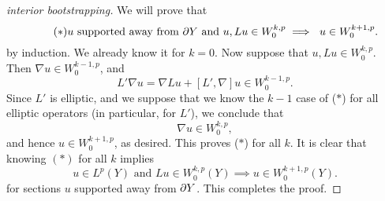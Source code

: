 \documentclass{amsart}
\begin{document}
   \begin{proof}[interior bootstrapping]
     We will prove that
     \begin{equation*}\tag{$\ast$}
       u\text{ supported away from $\partial Y$ and $u,Lu\in
         W^{k,p}_{0}$}\implies\text{ $u\in W^{k+1,p}_{0}$}.
     \end{equation*}
     by induction. We already know it for $k=0$. Now suppose that
     $u,Lu\in W^{k,p}_{0}$. Then $\nabla u\in W^{k-1,p}_{0}$, and
     \begin{equation*}
       L'\nabla u=\nabla L u+[L',\nabla]u\in W^{k-1,p}_{0}.
     \end{equation*}
     Since $L'$ is elliptic, and we suppose that we know the $k-1$
     case of ($\ast$) for all elliptic operators (in particular, for $L'$), we conclude that
     \begin{equation*}
       \nabla u\in W^{k,p}_{0},
     \end{equation*}
     and hence $u\in W^{k+1,p}_{0}$, as desired. This proves ($\ast$)
     for all $k$. It is clear that knowing $(\ast)$ for all $k$
     implies
     \begin{equation*}
       u\in L^{p}(Y)\text{ and }Lu\in W^{k,p}_{0}(Y)\implies u\in W^{k+1,p}_{0}(Y).
     \end{equation*}
     for sections $u$
     supported away from $\partial Y$. This completes the proof.
   \end{proof}
\end{document}
